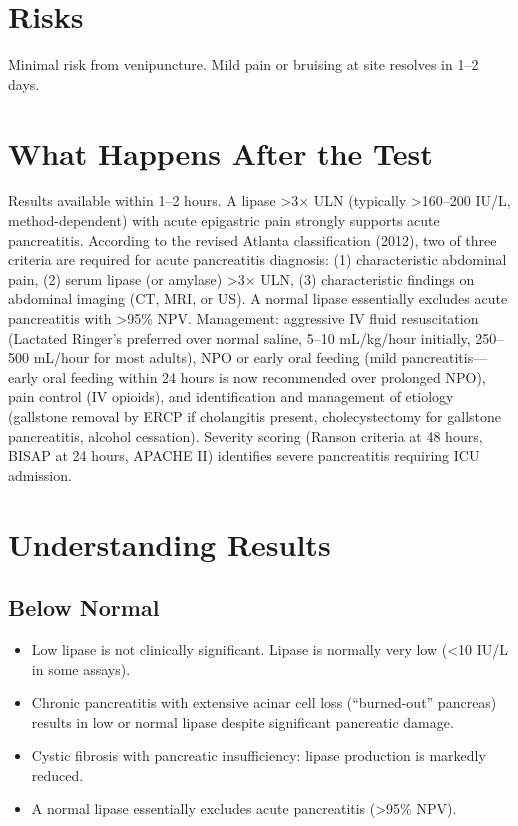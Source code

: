 \section*{Risks}
Minimal risk from venipuncture. Mild pain or bruising at site resolves in 1--2 days.

\section*{What Happens After the Test}
Results available within 1--2 hours. A lipase >3$\times$ ULN (typically >160--200 IU/L, method-dependent) with acute epigastric pain strongly supports acute pancreatitis. According to the revised Atlanta classification (2012), two of three criteria are required for acute pancreatitis diagnosis: (1) characteristic abdominal pain, (2) serum lipase (or amylase) >3$\times$ ULN, (3) characteristic findings on abdominal imaging (CT, MRI, or US). A normal lipase essentially excludes acute pancreatitis with >95\% NPV. Management: aggressive IV fluid resuscitation (Lactated Ringer's preferred over normal saline, 5--10 mL/kg/hour initially, 250--500 mL/hour for most adults), NPO or early oral feeding (mild pancreatitis---early oral feeding within 24 hours is now recommended over prolonged NPO), pain control (IV opioids), and identification and management of etiology (gallstone removal by ERCP if cholangitis present, cholecystectomy for gallstone pancreatitis, alcohol cessation). Severity scoring (Ranson criteria at 48 hours, BISAP at 24 hours, APACHE II) identifies severe pancreatitis requiring ICU admission.

\section*{Understanding Results}

\subsection*{Below Normal}
\begin{itemize}
  \item Low lipase is not clinically significant. Lipase is normally very low (<10 IU/L in some assays).
  \item Chronic pancreatitis with extensive acinar cell loss (``burned-out'' pancreas) results in low or normal lipase despite significant pancreatic damage.
  \item Cystic fibrosis with pancreatic insufficiency: lipase production is markedly reduced.
  \item A normal lipase essentially excludes acute pancreatitis (>95\% NPV).
\end{itemize}

